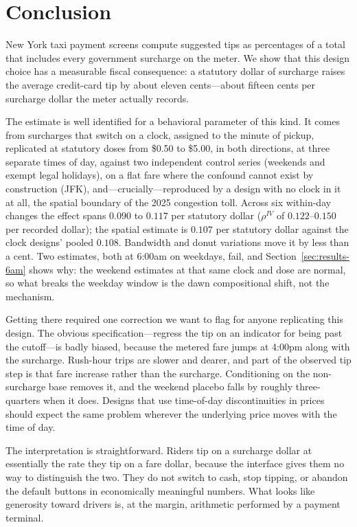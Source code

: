 \section{Conclusion}
\label{sec:conclusion}

New York taxi payment screens compute suggested tips as percentages of a
total that includes every government surcharge on the meter. We show
that this design choice has a measurable fiscal consequence: a
statutory dollar of surcharge raises the average credit-card tip by
about eleven cents---about fifteen cents per surcharge dollar the meter
actually records.

The estimate is well identified for a behavioral parameter of this kind.
It comes from surcharges that switch on a clock, assigned to the minute
of pickup, replicated at statutory doses from \$0.50 to \$5.00, in both
directions, at three separate times of day, against two independent
control series (weekends and exempt legal holidays), on a flat fare
where the confound cannot exist by construction (JFK),
and---crucially---reproduced by a design with no clock in it at all,
the spatial boundary of the 2025 congestion toll. Across six within-day changes the effect spans $0.090$ to
$0.117$ per statutory dollar ($\rho^{IV}$ of $0.122$--$0.150$ per
recorded dollar); the spatial estimate is $0.107$ per statutory dollar
against the clock designs' pooled $0.108$. Bandwidth and donut
variations move it by less than a cent. Two estimates, both at 6:00am on weekdays, fail, and
Section~\ref{sec:results-6am} shows why: the weekend estimates at that
same clock and dose are normal, so what breaks the weekday window is the
dawn compositional shift, not the mechanism.

Getting there required one correction we want to flag for anyone
replicating this design. The obvious specification---regress the tip on
an indicator for being past the cutoff---is badly biased, because the
metered fare jumps at 4:00pm along with the surcharge. Rush-hour trips
are slower and dearer, and part of the observed tip step is that
fare increase rather than the surcharge. Conditioning on the
non-surcharge base removes it, and the weekend placebo falls by roughly
three-quarters when it does. Designs that use time-of-day
discontinuities in prices should expect the same problem wherever the
underlying price moves with the time of day.

The interpretation is straightforward. Riders tip on a surcharge dollar
at essentially the rate they tip on a fare dollar, because the interface
gives them no way to distinguish the two. They do not switch to cash,
stop tipping, or abandon the default buttons in economically meaningful
numbers. What looks like generosity toward drivers is, at the margin,
arithmetic performed by a payment terminal.

